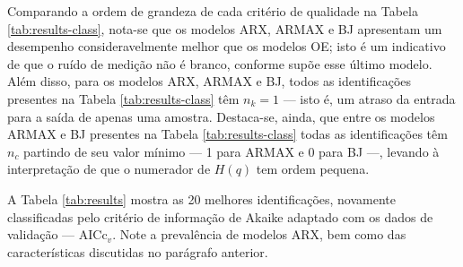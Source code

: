 \documentclass{ppgeesa}
\begin{document}
Comparando a ordem de grandeza de cada critério de qualidade na Tabela \ref{tab:results-class}, nota-se que os modelos ARX, ARMAX e BJ apresentam um desempenho consideravelmente melhor que os modelos OE;
isto é um indicativo de que o ruído de medição não é branco, conforme supõe esse último modelo.
Além disso, para os modelos ARX, ARMAX e BJ, todos as identificações presentes na Tabela \ref{tab:results-class} têm $n_k = 1$ --- isto é, um atraso da entrada para a saída de apenas uma amostra.
Destaca-se, ainda, que entre os modelos ARMAX e BJ presentes na Tabela \ref{tab:results-class} todas as identificações têm $n_c$ partindo de seu valor mínimo --- 1 para ARMAX e 0 para BJ ---, levando à interpretação de que o numerador de $H(q)$ tem ordem pequena.

A Tabela \ref{tab:results} mostra as 20 melhores identificações, novamente classificadas pelo critério de informação de Akaike adaptado com os dados de validação --- $\text{AICc}_v$.
Note a prevalência de modelos ARX, bem como das características discutidas no parágrafo anterior.
\end{document}
